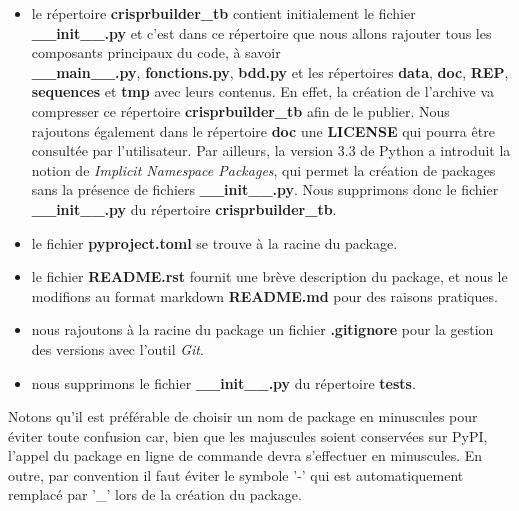 \documentclass[twoside,a4paper,11pt,frenchb,openany]{report}
\begin{document}
\begin{itemize}
\item le répertoire \textbf{crisprbuilder\_tb} contient initialement le fichier \textbf{\_\_init\_\_.py} et c'est dans ce répertoire que nous allons rajouter tous les composants principaux du code, à savoir \\\textbf{\_\_main\_\_.py}, \textbf{fonctions.py}, \textbf{bdd.py} et les répertoires \textbf{data}, \textbf{doc}, \textbf{REP}, \textbf{sequences} et \textbf{tmp} avec leurs contenus. En effet, la création de l'archive va compresser ce répertoire \textbf{crisprbuilder\_tb} afin de le publier. Nous rajoutons également dans le répertoire \textbf{doc} une \textbf{LICENSE} qui pourra être consultée par l'utilisateur. Par ailleurs, la version 3.3 de Python a introduit la notion de \textit{Implicit Namespace Packages}, qui permet la création de packages sans la présence de fichiers \textbf{\_\_init\_\_.py}. Nous supprimons donc le fichier \textbf{\_\_init\_\_.py} du répertoire \textbf{crisprbuilder\_tb}.  %
\item le fichier \textbf{pyproject.toml} se trouve à la racine du package. 
\item le fichier \textbf{README.rst} fournit une brève description du package, et nous le modifions au format markdown \textbf{README.md} pour des raisons pratiques.  
\item nous rajoutons à la racine du package un fichier \textbf{.gitignore} pour la gestion des versions avec l'outil \textit{Git}.
\item nous supprimons le fichier \textbf{\_\_init\_\_.py} du répertoire \textbf{tests}. %
\end{itemize}

Notons qu'il est préférable de choisir un nom de package en minuscules pour éviter toute confusion car, bien que les majuscules soient conservées sur PyPI, l'appel du package en ligne de commande devra s'effectuer en minuscules. En outre, par convention il faut éviter le symbole '-' qui est automatiquement remplacé par '\_' lors de la création du package.
\end{document}
